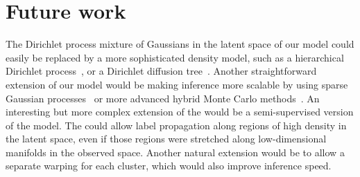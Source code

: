 

\section{Future work}

The Dirichlet process mixture of Gaussians in the latent space of our model could easily be replaced by a more sophisticated density model, such as a hierarchical Dirichlet process~\citep{teh2006hierarchical}, or a Dirichlet diffusion tree~\citep{neal2003density}.
Another straightforward extension of our model would be making inference more scalable by using sparse Gaussian processes~\citep{quinonero2005unifying,snelson2006sparse} or more advanced hybrid Monte Carlo methods~\citep{zhang2011quasi}.
An interesting but more complex extension of the \iwmm{} would be a semi-supervised version of the model.
The \iwmm{} could allow label propagation along regions of high density in the latent space, even if those regions were stretched along low-dimensional manifolds in the observed space.  Another natural extension would be to allow a separate warping for each cluster, which would also improve inference speed.




%
%


